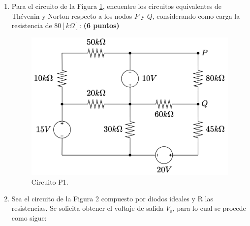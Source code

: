 \documentclass[
	spanish, %
	letterpaper, oneside
]{article}
\begin{document}
\begin{enumerate}
    \item Para el circuito de la Figura \ref{fig:p1}, encuentre los circuitos equivalentes de Thévenin y Norton respecto a los nodos $P$ y $Q$, considerando como carga la resistencia de 80$[k\Omega]$: \textbf{(6 puntos)}
    \begin{figure}
        \centering
        \includegraphics[width=0.6\linewidth]{img/P1.png}
        \caption{Circuito P1.}
        \label{fig:p1}
    \end{figure}

    \item Sea el circuito de la Figura 2 compuesto por diodos ideales y R las resistencias. Se solicita obtener el voltaje de salida $V_o$, para lo cual se procede como sigue:


\end{enumerate}
\end{document}
